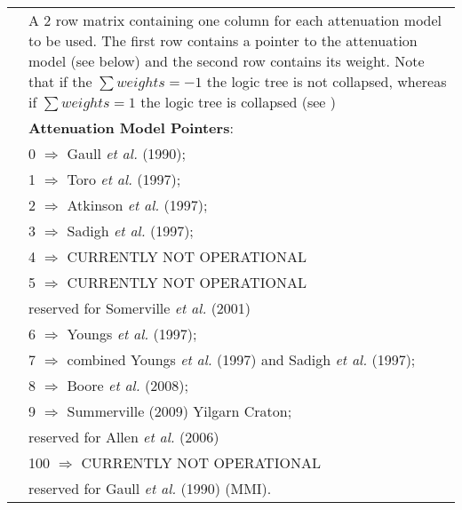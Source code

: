 \documentclass[a4paper, 12pt]{report}
\begin{document}
\begin{supertabular}{lp{0.6\textwidth}}
    &  A 2 row matrix containing one
column for each attenuation model to be used.
The first row contains a pointer to the attenuation model (see below) and the second row contains its weight. Note that if the $\sum weights =-1$ the logic tree is not collapsed, whereas if $\sum weights =1$ the logic tree is collapsed (see )\\
&  \textbf{Attenuation Model Pointers}: \\
 & \hspace{0.5em} 0 $\Rightarrow$ Gaull \textit{et al.} (1990); \\
 & \hspace{0.5em} 1 $\Rightarrow$ Toro \textit{et al.} (1997); \\
 & \hspace{0.5em} 2 $\Rightarrow$ Atkinson \textit{et al.} (1997); \\
 & \hspace{0.5em} 3 $\Rightarrow$ Sadigh \textit{et al.} (1997); \\
 & \hspace{0.5em} 4 $\Rightarrow$ \small{CURRENTLY NOT OPERATIONAL} \\
& \hspace{0.5em} 5 $\Rightarrow$ \small{CURRENTLY NOT OPERATIONAL} \\
 & \hspace{3em} reserved for Somerville \textit{et al.} (2001) \\
 & \hspace{0.5em} 6 $\Rightarrow$ Youngs \textit{et al.} (1997); \\
 & \hspace{0.5em} 7 $\Rightarrow$ combined Youngs \textit{et al.} (1997) and Sadigh \textit{et al.} (1997); \\
 & \hspace{0.5em} 8 $\Rightarrow$ Boore \textit{et al.} (2008); \\
 & \hspace{0.5em} 9 $\Rightarrow$ Summerville (2009) Yilgarn Craton; \\
 & \hspace{3em} reserved for Allen \textit{et al.} (2006) \\
& \hspace{0.5em} 100 $\Rightarrow$ \small{CURRENTLY NOT OPERATIONAL} \\
 & \hspace{3em} reserved for Gaull \textit{et al.} (1990) (MMI). \\

\end{supertabular}
\end{document}
